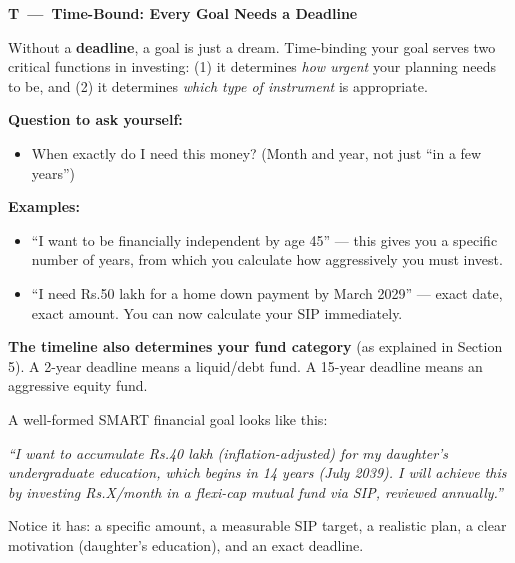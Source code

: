 \documentclass[12pt,a4paper]{article}
\makeatletter
\newcommand{\rupee}{\ifmmode\text{Rs.}\else Rs.\@\fi}
\newcommand{\smartheading}[4]{%
  \begingroup
  \setlength{\fboxsep}{4pt}%
  \noindent\colorbox{#1}{%
    \parbox{\dimexpr\linewidth-2\fboxsep\relax}{%
      \Large\bfseries\color{#4}#2\ \normalsize\bfseries---\ #3\strut%
    }%
  }%
  \par\endgroup\medskip
}
\makeatother
\begin{document}
\begin{tcolorbox}[base, colback=AccentPurple!8, colframe=AccentPurple]
\smartheading{AccentPurple}{T}{Time-Bound: Every Goal Needs a Deadline}{white}

Without a \textbf{deadline}, a goal is just a dream. Time-binding your goal serves two critical functions in investing: (1) it determines \textit{how urgent} your planning needs to be, and (2) it determines \textit{which type of instrument} is appropriate.

\medskip
\textbf{Question to ask yourself:}
\begin{itemize}
  \item When exactly do I need this money? (Month and year, not just ``in a few years'')
\end{itemize}

\medskip
\textbf{Examples:}
\begin{itemize}
  \item ``I want to be financially independent by age 45'' --- this gives you a specific number of years, from which you calculate how aggressively you must invest.
  \item ``I need \rupee{}50 lakh for a home down payment by March 2029'' --- exact date, exact amount. You can now calculate your SIP immediately.
\end{itemize}

\medskip
\textbf{The timeline also determines your fund category} (as explained in Section 5). A 2-year deadline means a liquid/debt fund. A 15-year deadline means an aggressive equity fund.
\end{tcolorbox}

\vspace{3mm}

\begin{keybox}
A well-formed SMART financial goal looks like this:

\medskip
\textit{``I want to accumulate \rupee{}40 lakh (inflation-adjusted) for my daughter's undergraduate education, which begins in 14 years (July 2039). I will achieve this by investing \rupee{}X/month in a flexi-cap mutual fund via SIP, reviewed annually.''}

\medskip
Notice it has: a specific amount, a measurable SIP target, a realistic plan, a clear motivation (daughter's education), and an exact deadline.
\end{keybox}

\end{document}
